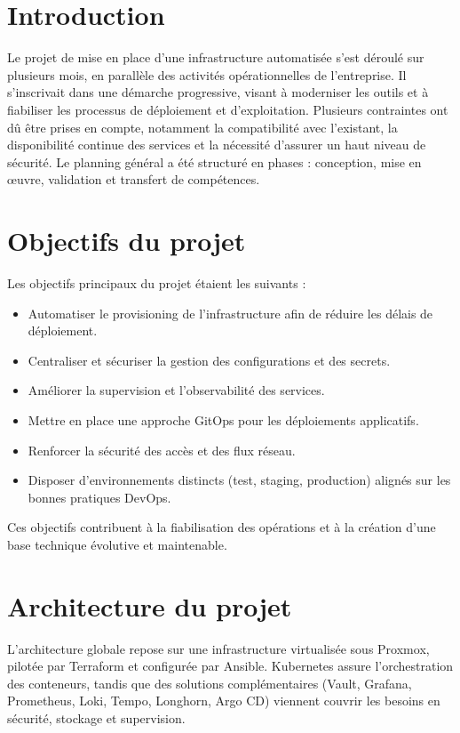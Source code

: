 \section{Introduction}

Le projet de mise en place d'une infrastructure automatisée s'est déroulé sur plusieurs mois, en parallèle des activités opérationnelles de l'entreprise. Il s'inscrivait dans une démarche progressive, visant à moderniser les outils et à fiabiliser les processus de déploiement et d'exploitation. Plusieurs contraintes ont dû être prises en compte, notamment la compatibilité avec l'existant, la disponibilité continue des services et la nécessité d'assurer un haut niveau de sécurité. Le planning général a été structuré en phases : conception, mise en œuvre, validation et transfert de compétences.

\section{Objectifs du projet}

Les objectifs principaux du projet étaient les suivants :

\begin{itemize}
  \item Automatiser le provisioning de l'infrastructure afin de réduire les délais de déploiement.
  \item Centraliser et sécuriser la gestion des configurations et des secrets.
  \item Améliorer la supervision et l'observabilité des services.
  \item Mettre en place une approche GitOps pour les déploiements applicatifs.
  \item Renforcer la sécurité des accès et des flux réseau.
  \item Disposer d'environnements distincts (test, staging, production) alignés sur les bonnes pratiques DevOps.
\end{itemize}

Ces objectifs contribuent à la fiabilisation des opérations et à la création d'une base technique évolutive et maintenable.

\section{Architecture du projet}

L'architecture globale repose sur une infrastructure virtualisée sous Proxmox, pilotée par Terraform et configurée par Ansible. Kubernetes assure l'orchestration des conteneurs, tandis que des solutions complémentaires (Vault, Grafana, Prometheus, Loki, Tempo, Longhorn, Argo CD) viennent couvrir les besoins en sécurité, stockage et supervision.

